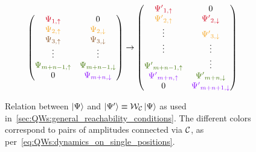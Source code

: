 \begin{figure}[tb]
    \centering
    \begin{equation}
    \begin{pmatrix}
    \textcolor[rgb]{0.82,0.01,0.11}{\Psi _{1,\uparrow }} & 0\\
    \textcolor[rgb]{0.96,0.65,0.14}{\Psi _{2,\uparrow }} & \textcolor[rgb]{0.96,0.65,0.14}{\Psi }\textcolor[rgb]{0.96,0.65,0.14}{_{2,\downarrow }}\\
    \textcolor[rgb]{0.55,0.34,0.16}{\Psi _{3,\uparrow }} & \textcolor[rgb]{0.55,0.34,0.16}{\Psi }\textcolor[rgb]{0.55,0.34,0.16}{_{3,\downarrow }}\\
    \vdots  & \vdots \\
    \textcolor[rgb]{0.25,0.46,0.02}{\Psi _{m+n-1,\uparrow }} & \textcolor[rgb]{0.25,0.46,0.02}{\Psi }\textcolor[rgb]{0.25,0.46,0.02}{_{m+n-1,\downarrow }}\\
    0 & \textcolor[rgb]{0.56,0.07,1}{\Psi }\textcolor[rgb]{0.56,0.07,1}{_{m+n,\downarrow }}
    \end{pmatrix}\rightarrow \begin{pmatrix}
    \textcolor[rgb]{0.82,0.01,0.11}{\Psi '}\textcolor[rgb]{0.82,0.01,0.11}{_{1,\uparrow }} & 0\\
    \textcolor[rgb]{0.96,0.65,0.14}{\Psi '}\textcolor[rgb]{0.96,0.65,0.14}{_{2,\uparrow }} & \textcolor[rgb]{0.82,0.01,0.11}{\Psi '}\textcolor[rgb]{0.82,0.01,0.11}{_{2,\downarrow }}\\
    \vdots  & \textcolor[rgb]{0.96,0.65,0.14}{\Psi '}\textcolor[rgb]{0.96,0.65,0.14}{_{3,\downarrow }}\\
    \vdots  & \vdots \\
    \textcolor[rgb]{0.25,0.46,0.02}{\Psi '}\textcolor[rgb]{0.25,0.46,0.02}{_{m+n-1,\uparrow }} & \vdots \\
    \textcolor[rgb]{0.56,0.07,1}{\Psi '}\textcolor[rgb]{0.56,0.07,1}{_{m+n,\uparrow }} & \textcolor[rgb]{0.25,0.46,0.02}{\Psi '}\textcolor[rgb]{0.25,0.46,0.02}{_{m+n,\downarrow }}\\
    0 & \textcolor[rgb]{0.56,0.07,1}{\Psi '}\textcolor[rgb]{0.56,0.07,1}{_{m+n+1,\downarrow }}
    \end{pmatrix}
    \end{equation}
    \caption{
        Relation between $\ket\Psi$ and $\ket{\Psi'}\equiv{\mathcal{W}}_{\mathcal{C}}\ket\Psi$ as used in~\cref{sec:QWs:general_reachability_conditions}. The different colors correspond to pairs of amplitudes connected via ${\mathcal{C}}$, as per~\cref{eq:QWs:dynamics_on_single_positions}.
    }
    \label{fig:QWs:visualisation_PsiVsPsip}
\end{figure}

